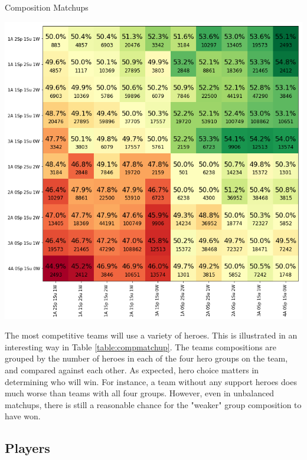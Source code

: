 \documentclass[twoside,twocolumn]{article}
\begin{document}
\begin{table}
\caption{Composition Matchups}
\label{table:compmatchup}
\centering
\includegraphics[width=\textwidth]{compmatchup}
\end{table}

The most competitive teams will use a variety of heroes.  This is illustrated in an interesting way in Table \ref{table:compmatchup}.  The teams compositions are grouped by the number of heroes in each of the four hero groups on the team, and compared against each other.  As expected, hero choice matters in determining who will win.  For instance, a team without any support heroes does much worse than teams with all four groups.  However, even in unbalanced matchups, there is still a reasonable chance for the "weaker" group composition to have won.

\subsection {Players}
\label{players}
\end{document}
